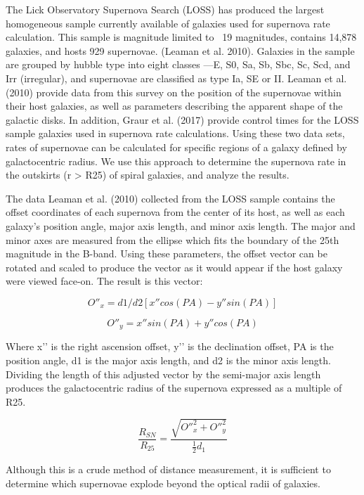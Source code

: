 \documentclass[apj]{emulateapj}
\begin{document}
The Lick Observatory Supernova Search (LOSS) has produced the largest homogeneous sample currently available of galaxies used for supernova rate calculation. This sample is magnitude limited to ~19 magnitudes, contains 14,878 galaxies, and hosts 929 supernovae. (Leaman et al. 2010). Galaxies in the sample are grouped by hubble type into eight classes —E, S0, Sa, Sb, Sbc, Sc, Scd, and Irr (irregular), and supernovae are classified as type Ia, SE or II. Leaman et al. (2010) provide data from this survey on the position of the supernovae within their host galaxies, as well as parameters describing the apparent shape of the galactic disks. In addition, Graur et al. (2017) provide control times for the LOSS sample galaxies used in supernova rate calculations. Using these two data sets, rates of supernovae can be calculated for specific regions of a galaxy defined by galactocentric radius. We use this approach to determine the supernova rate in the outskirts (r > R25) of spiral galaxies, and analyze the results.

The data Leaman et al. (2010) collected from the LOSS sample contains the offset coordinates of each supernova from the center of its host, as well as each galaxy’s position angle, major axis length, and minor axis length. The major and minor axes are measured from the ellipse which fits the boundary of the 25th magnitude in the B-band. Using these parameters, the offset vector can be rotated and scaled to produce the vector as it would appear if the host galaxy were viewed face-on. The result is this vector:

\begin{equation}
O''_x=d1/d2[x''cos(PA)-y''sin(PA)]
\end{equation}

\begin{equation}
O''_y=x''sin(PA)+y''cos(PA)
\end{equation}

Where x’’ is the right ascension offset, y’’ is the declination offset, PA is the position angle, d1 is the major axis length, and d2 is the minor axis length. Dividing the length of this adjusted vector by the semi-major axis length produces the galactocentric radius of the supernova expressed as a multiple of R25.

\begin{equation}
\frac{R_{SN}}{R_{25}}=\frac{\sqrt{{O''}_x^2 + {O''}_y^2}}{\frac{1}{2} d_1}
\end{equation}

Although this is a crude method of distance measurement, it is sufficient to determine which supernovae explode beyond the optical radii of galaxies.
\end{document}

